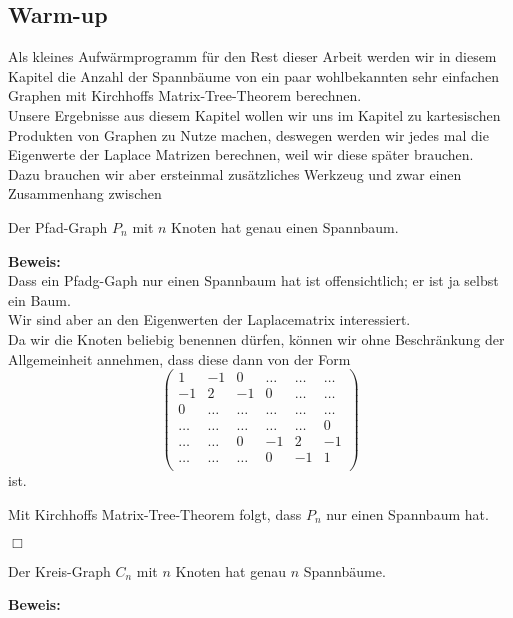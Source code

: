 \subsection{Warm-up}
Als kleines Aufwärmprogramm für den Rest dieser Arbeit werden wir in diesem Kapitel die Anzahl der Spannbäume von ein paar wohlbekannten sehr einfachen Graphen mit Kirchhoffs Matrix-Tree-Theorem berechnen.\\
Unsere Ergebnisse aus diesem Kapitel wollen wir uns im Kapitel zu kartesischen Produkten von Graphen zu Nutze machen, deswegen werden wir jedes mal die Eigenwerte der Laplace Matrizen berechnen, weil wir diese später brauchen.\\
Dazu brauchen wir aber ersteinmal zusätzliches Werkzeug und zwar einen Zusammenhang zwischen 
\begin{Lms}
 Der Pfad-Graph $P_n$ mit $n$ Knoten hat genau einen Spannbaum.
\end{Lms}
\textbf{Beweis:}\\
Dass ein Pfadg-Gaph nur einen Spannbaum hat ist offensichtlich; er ist ja selbst ein Baum.\\
Wir sind aber an den Eigenwerten der Laplacematrix interessiert.\\
Da wir die Knoten beliebig benennen dürfen, können wir ohne Beschränkung der Allgemeinheit annehmen, dass diese dann von der Form
\begin{equation}
\begin{pmatrix}
1&-1&0&\ldots&\ldots&\ldots\\
-1&2&-1&0&\ldots&\ldots\\
0&\ldots&\ldots&\ldots&\ldots&\ldots\\
\ldots&\ldots&\ldots&\ldots&\ldots&0\\
\ldots&\ldots&0&-1&2&-1\\
\ldots&\ldots&\ldots&0&-1&1\\
\end{pmatrix}
\end{equation}
ist.

Mit Kirchhoffs Matrix-Tree-Theorem folgt, dass $P_n$ nur einen Spannbaum hat.
\begin{flushright} $\Box$ \end{flushright} 
\begin{Lms}
 Der Kreis-Graph $C_n$ mit $n$ Knoten hat genau $n$ Spannbäume.
\end{Lms}
\textbf{Beweis:}\\
